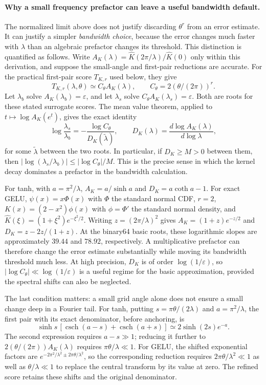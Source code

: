 \paragraph{Why a small frequency prefactor can leave a useful bandwidth default.}
The normalized limit above does not justify discarding $\theta^r$ from an
error estimate. It can justify a simpler \emph{bandwidth choice}, because
the error changes much faster with $\lambda$ than an algebraic prefactor
changes its threshold. This distinction is quantified as follows.
Write $A_K(\lambda)=\widehat K(2\pi/\lambda)/\widehat K(0)$ only within
this derivation, and suppose the small-angle and first-pair reductions are
accurate. For the practical first-pair score $T_{K,r}$ used below, they give
\[
 T_{K,r}(\lambda,\theta)\simeq C_\theta A_K(\lambda),
 \qquad C_\theta=2(\theta/(2\pi))^r.
\]
Let $\lambda_b$ solve $A_K(\lambda_b)=\varepsilon$, and let
$\lambda_s$ solve $C_\theta A_K(\lambda_s)=\varepsilon$.
Both are roots for these stated surrogate scores. The mean value theorem,
applied to $t\mapsto\log A_K(e^t)$, gives the exact identity
\begin{equation}
 \log\frac{\lambda_s}{\lambda_b}
 =-\frac{\log C_\theta}{D_K(\widetilde\lambda)},\qquad
 D_K(\lambda)=\frac{d\log A_K(\lambda)}{d\log\lambda},
 \label{eq:lambda-log-sensitivity}
\end{equation}
for some $\widetilde\lambda$ between the two roots. In particular, if
$D_K\ge M>0$ between them, then
$|\log(\lambda_s/\lambda_b)|\le|\log C_\theta|/M$.
This is the precise sense in which the kernel decay dominates a prefactor
in the bandwidth calculation.

For tanh, with $a=\pi^2/\lambda$,
$A_K=a/\sinh a$ and $D_K=a\coth a-1$.
For exact GELU, $\psi(x)=x\Phi(x)$ with $\Phi$ the standard normal CDF,
$r=2$, $K(x)=(2-x^2)\phi(x)$ with $\phi=\Phi'$ the standard normal density, and $\widehat K(\xi)=(1+\xi^2)e^{-\xi^2/2}$.
Writing $z=(2\pi/\lambda)^2$ gives $A_K=(1+z)e^{-z/2}$ and
$D_K=z-2z/(1+z)$.
At the binary64 basic roots, these logarithmic slopes are approximately
$39.44$ and $78.92$, respectively. A multiplicative prefactor can therefore
change the error estimate substantially while moving its bandwidth
threshold much less. At high precision, $D_K$ is of order
$\log(1/\varepsilon)$, so
$|\log C_\theta|\ll\log(1/\varepsilon)$ is a useful regime for the basic
approximation, provided the spectral shifts can also be neglected.

The last condition matters: a small grid angle alone does not ensure a
small change deep in a Fourier tail. For tanh, putting
$s=\pi\theta/(2\lambda)$ and $a=\pi^2/\lambda$, the first pair with its
exact denominator, before anchoring, is
\[
 \sinh s\,[\operatorname{csch}(a-s)+\operatorname{csch}(a+s)]
 \simeq2\sinh(2s)e^{-a}.
\]
The second expression requires $a-s\gg1$; reducing it further to
$2(\theta/(2\pi))A_K(\lambda)$ requires $\pi\theta/\lambda\ll1$.
For GELU, the shifted exponential factors are
$e^{-2\pi^2/\lambda^2\pm2\pi\theta/\lambda^2}$, so the corresponding
reduction requires $2\pi\theta/\lambda^2\ll1$ as well as
$\theta/\lambda\ll1$ to replace the central transform by its value at zero.
The refined score retains these shifts and the original denominator.


